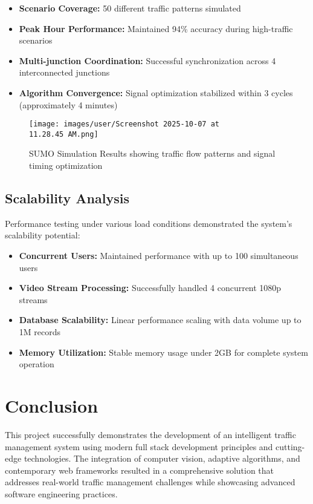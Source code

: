 \documentclass[conference]{IEEEtran}
\begin{document}
\begin{itemize}
\item \textbf{Scenario Coverage:} 50 different traffic patterns simulated
\item \textbf{Peak Hour Performance:} Maintained 94\% accuracy during high-traffic scenarios
\item \textbf{Multi-junction Coordination:} Successful synchronization across 4 interconnected junctions
\item \textbf{Algorithm Convergence:} Signal optimization stabilized within 3 cycles (approximately 4 minutes)
\end{itemize}

\begin{figure}[H]
\centering
\texttt{[image: images/user/Screenshot 2025-10-07 at 11.28.45 AM.png]}
\caption{SUMO Simulation Results showing traffic flow patterns and signal timing optimization}
\label{fig:sumo_results}
\end{figure}

\subsection{Scalability Analysis}

Performance testing under various load conditions demonstrated the system's scalability potential:

\begin{itemize}
\item \textbf{Concurrent Users:} Maintained performance with up to 100 simultaneous users
\item \textbf{Video Stream Processing:} Successfully handled 4 concurrent 1080p streams
\item \textbf{Database Scalability:} Linear performance scaling with data volume up to 1M records
\item \textbf{Memory Utilization:} Stable memory usage under 2GB for complete system operation
\end{itemize}

\section{Conclusion}

This project successfully demonstrates the development of an intelligent traffic management system using modern full stack development principles and cutting-edge technologies. The integration of computer vision, adaptive algorithms, and contemporary web frameworks resulted in a comprehensive solution that addresses real-world traffic management challenges while showcasing advanced software engineering practices.
\end{document}
